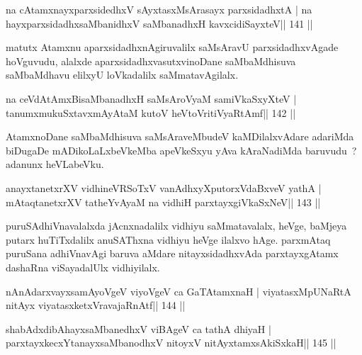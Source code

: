 \begin{shl}
na cA\s\s tamxnayxparxsidedhxV sAyxtasxMsArasayx parxsidadhxtA |
na hayxparxsidadhxsaMbanidhxV saMbanadhxH kavxcidiSayxteV\hfill || 141 ||
\end{shl}

\begin{artha}
matutx Atamxnu aparxsidadhxnAgiruvalilx saMsAravU parxsidadhxvAgade hoVguvudu, alalxde aparxsidadhxvasutxvinoDane saMbaMdhisuva saMbaMdhavu elilxyU loVkadalilx saMmatavAgilalx.
\end{artha}

\begin{shl}
na ceVdAtAmxBisaMbanadhxH saMsAroV\s yaM samiVkaSxyXteV |
tanumxmukuSxtavxmAyAtaM kutoV heVtoVritiVyaRtAmf\hfill || 142 ||
\end{shl}

\begin{artha}
AtamxnoDane saMbaMdhisuva saMsAraveMbudeV kaMDilalxvAdare adariMda biDugaDe mADikoLaLxbeVkeMba apeVkeSxyu yAva kAraNadiMda baruvudu~? adanunx heVLabeVku.
\end{artha}


\begin{shl}
anayxtanetxrXV vidhineVRSoTxV vanAdhxyXputorxVdaBxveV yathA |
mAtaqtanetxrXV tatheYvAyaM na vidhiH parxtayxgiVkaSxNeV\hfill || 143 ||
\end{shl}

\begin{artha}
puruSAdhiVnavalalxda jAcnxnadalilx vidhiyu saMmatavalalx, heVge, baMjeya putarx huTiTxdalilx anuSAThxna vidhiyu heVge ilalxvo hAge. parxmAtaq puruSana adhiVnavAgi baruva aMdare nitayxsidadhxvAda parxtayxgAtamx dashaRna viSayadalUlx vidhiyilalx.
\end{artha}


\begin{shl}
\footnotemark[1]nAnAdarxvayxsamAyoVgeV viyoVgeV ca GaTAtamxnaH |
viyatasxMpUNaRtA nitAyx viyatasxketxVravajaRnAtf\hfill || 144 ||
\end{shl}

\begin{shl}
\footnotemark[2]shabAdxdibAhayxsaMbanedhxV viBAgeV ca tathA dhiyaH |
parxtayxkecxYtanayxsaMbanodhxV nitoyxV nitAyxtamxsAkiSxkaH\hfill || 145 ||
\end{shl}

